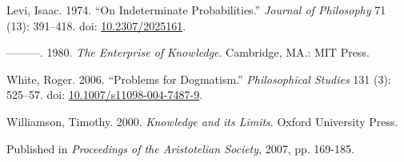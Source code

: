 \documentclass[
  10pt,
  letterpaper,
  DIV=11,
  numbers=noendperiod,
  twoside]{scrartcl}
\newlength{\cslhangindent}
\newenvironment{CSLReferences}[2] %
 {\begin{list}{}{%
  \setlength{\itemindent}{0pt}
  \setlength{\leftmargin}{0pt}
  \setlength{\parsep}{0pt}
  \ifodd #1
   \setlength{\leftmargin}{\cslhangindent}
   \setlength{\itemindent}{-1\cslhangindent}
  \fi
  \setlength{\itemsep}{#2\baselineskip}}}
 {\end{list}}
\begin{document}
\begin{CSLReferences}{1}{0}
Levi, Isaac. 1974. {``On Indeterminate Probabilities.''} \emph{Journal
of Philosophy} 71 (13): 391--418. doi:
\href{https://doi.org/10.2307/2025161}{10.2307/2025161}.

---------. 1980. \emph{The Enterprise of Knowledge}. Cambridge, MA.: MIT
Press.

White, Roger. 2006. {``Problems for Dogmatism.''} \emph{Philosophical
Studies} 131 (3): 525--57. doi:
\href{https://doi.org/10.1007/s11098-004-7487-9}{10.1007/s11098-004-7487-9}.

Williamson, Timothy. 2000. \emph{{Knowledge and its Limits}}. Oxford
University Press.

\end{CSLReferences}



\noindent Published in\emph{
Proceedings of the Aristotelian Society}, 2007, pp. 169-185.
\end{document}
